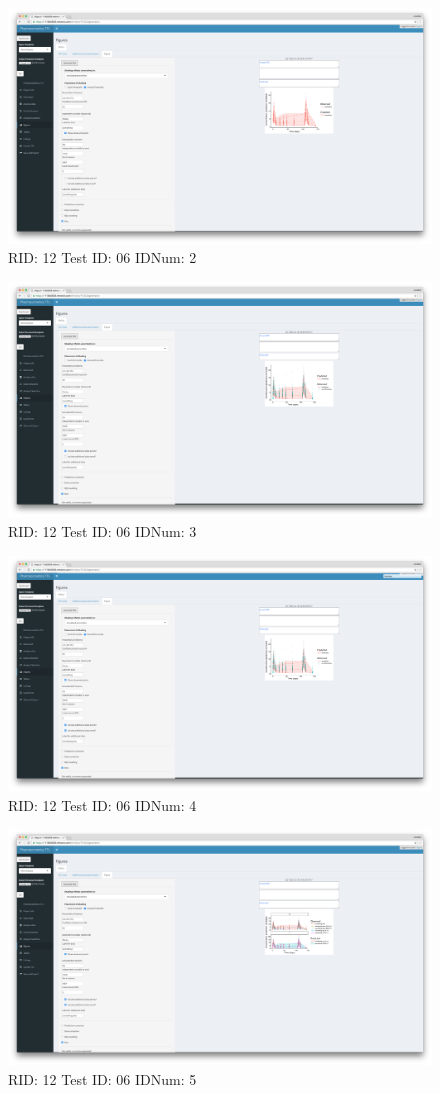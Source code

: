 \begin{figure}[H]
\includegraphics[width=.8\textwidth]{screencaps/12-06-2.png}
\caption{RID: 12 Test ID: 06 IDNum: 2}
\end{figure}
\begin{figure}[H]
\includegraphics[width=.8\textwidth]{screencaps/12-06-3.png}
\caption{RID: 12 Test ID: 06 IDNum: 3}
\end{figure}
\begin{figure}[H]
\includegraphics[width=.8\textwidth]{screencaps/12-06-4.png}
\caption{RID: 12 Test ID: 06 IDNum: 4}
\end{figure}
\begin{figure}[H]
\includegraphics[width=.8\textwidth]{screencaps/12-06-5.png}
\caption{RID: 12 Test ID: 06 IDNum: 5}
\end{figure}
